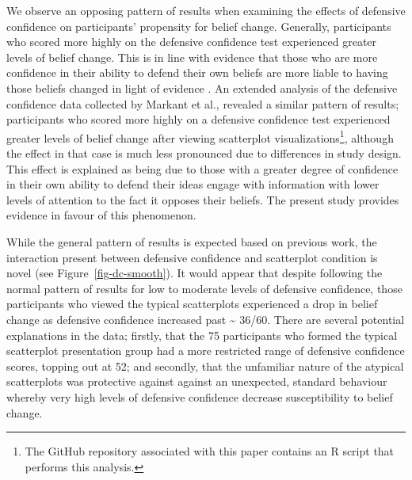 \documentclass[manuscript,screen,review]{acmart}
\begin{document}
We observe an opposing pattern of results when examining the effects of
defensive confidence on participants' propensity for belief change.
Generally, participants who scored more highly on the defensive
confidence test experienced greater levels of belief change. This is in
line with evidence that those who are more confidence in their ability
to defend their own beliefs are more liable to having those beliefs
changed in light of evidence \citep{albarracin_2004}. An extended
analysis of the defensive confidence data collected by Markant et al.,
\citep{markant_2023} revealed a similar pattern of results; participants
who scored more highly on a defensive confidence test experienced
greater levels of belief change after viewing scatterplot
visualizations\footnote{The GitHub repository associated with this paper
  contains an R script that performs this analysis.}, although the
effect in that case is much less pronounced due to differences in study
design. This effect is explained as being due to those with a greater
degree of confidence in their own ability to defend their ideas engage
with information with lower levels of attention to the fact it opposes
their beliefs. The present study provides evidence in favour of this
phenomenon.

While the general pattern of results is expected based on previous work,
the interaction present between defensive confidence and scatterplot
condition is novel (see Figure~\ref{fig-dc-smooth}). It would appear
that despite following the normal pattern of results for low to moderate
levels of defensive confidence, those participants who viewed the
typical scatterplots experienced a drop in belief change as defensive
confidence increased past \textasciitilde{} 36/60. There are several
potential explanations in the data; firstly, that the 75 participants
who formed the typical scatterplot presentation group had a more
restricted range of defensive confidence scores, topping out at 52; and
secondly, that the unfamiliar nature of the atypical scatterplots was
protective against against an unexpected, standard behaviour whereby
very high levels of defensive confidence decrease susceptibility to
belief change.
\end{document}
